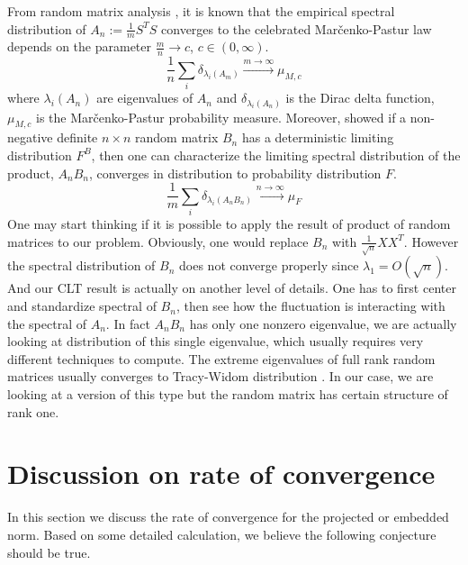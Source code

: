 \documentclass[12pt]{extarticle}
\newcommand{\1}{\field{1}}
\numberwithin{equation}{section}
\begin{document}
From random matrix analysis \cite{marvcenko1967distribution}, it is known that the empirical spectral distribution of $A_n:=\frac{1}{m}S^TS$ converges to the celebrated Mar{\v c}enko-Pastur law depends on the parameter $\frac{m}{n} \to c$, $c \in (0,\infty)$.   
\[
 \frac{1}{n} \sum_i \delta_{\lambda_i(A_m)}  \xrightarrow{m\to \infty}  \mu_{M,c}
\]
where $\lambda_i(A_n)$ are eigenvalues of $A_n$ and $\delta_{\lambda_i(A_n)}$ is the Dirac delta function, $\mu_{M,c}$ is the Mar{\v c}enko-Pastur probability measure. Moreover, \cite{yin1986limiting, silverstein1995strong, bai2010spectral} showed if a non-negative definite $n\times n$ random matrix $B_n$ has a deterministic limiting distribution $F^B$, then one can characterize the limiting spectral distribution of the product, $A_n B_n$, converges in distribution to probability distribution $F$.
\[
 \frac{1}{m} \sum_i \delta_{\lambda_i(A_nB_n)}  \xrightarrow{n\to \infty}  \mu_{F}
\]
One may start thinking if it is possible to apply the result of product of random matrices to our problem. Obviously, one would replace $B_n$ with  $\frac{1}{\sqrt{n}}XX^T$. However the spectral distribution of $B_n$ does not converge properly since $\lambda_1 = O(\sqrt{n})$. And our CLT result is actually on another level of details. One has to first center and standardize spectral of $B_n$, then see how the fluctuation is interacting with the spectral of $A_n$. In fact  $A_nB_n$ has only one nonzero eigenvalue, we are actually looking at distribution of this single eigenvalue, which usually requires very different techniques to compute. The extreme eigenvalues of full rank random matrices usually converges to Tracy-Widom distribution \cite{tracy1994level, johnstone2001distribution}.  In our case, we are looking at a version of this type but the random matrix has certain structure of rank one.






\section{Discussion on rate of convergence }\label{sec:Open questions}
In this section we discuss the rate of convergence for the projected or embedded norm. Based on some detailed calculation, we believe the following conjecture should be true.
\end{document}
